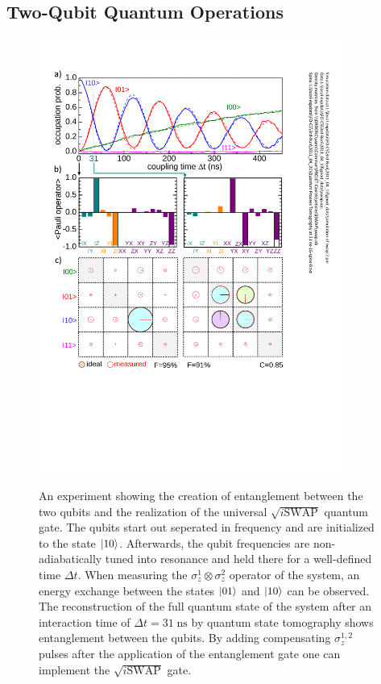 \subsection{Two-Qubit Quantum Operations}

\begin{figure}
	\centering
		\includegraphics[width=0.9\textwidth]{./material/papers/iswap/submission1/Dewes_Figure2}
	\label{fig:iSwap2}
	\caption{An experiment showing the creation of entanglement between the two qubits and the realization of the universal $\sqrt{i\mathrm{SWAP}}$ quantum gate. The qubits start out seperated in frequency and are initialized to the state $\left| 10 \right>$. Afterwards, the qubit frequencies are non-adiabatically tuned into resonance and held there for a well-defined time $\Delta t$. When measuring the $\sigma_z^1 \otimes \sigma_z^2$ operator of the system, an energy exchange between the states $\left| 01 \right>$ and $\left| 10 \right>$ can be observed. The reconstruction of the full quantum state of the system after an interaction time of $\Delta t = 31 \; \mathrm{ns} $ by quantum state tomography shows entanglement between the qubits. By adding compensating $\sigma_z^{1,2}$ pulses after the application of the entanglement gate one can implement the $\sqrt{i\mathrm{SWAP}}$ gate.}
\end{figure}

